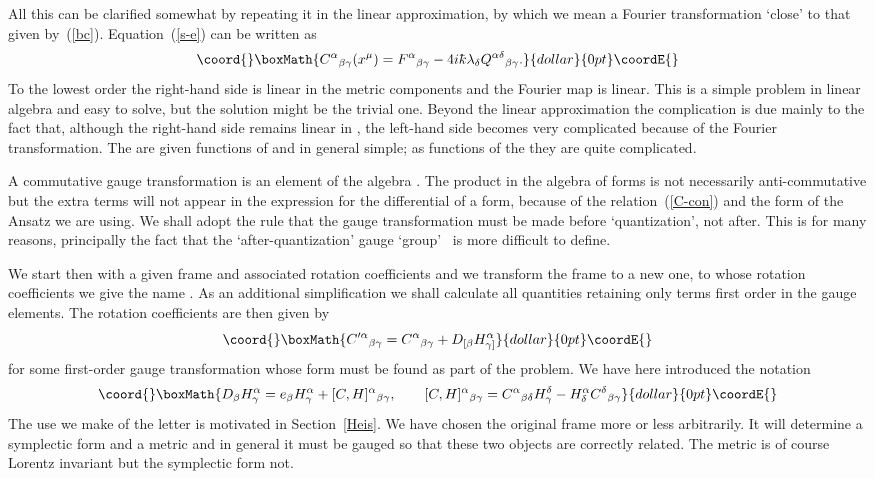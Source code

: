 \documentclass[12pt,a4paper]{article}
\def\b#1{{\mathbb #1}}
\def\c#1{{\cal #1}}
\def\kbar{{\mathchar'26\mkern-9muk}}
\begin{document}
All this can be clarified somewhat by repeating it in the linear
approximation, by which we mean a Fourier transformation `close' to
that given by~(\ref{bc}). Equation~(\ref{s-e}) can be written as
$$\coord{}\boxMath{
C^\alpha{}_{\beta\gamma}(x^\mu) = F^\alpha{}_{\beta\gamma} -
4i\kbar\lambda_\delta Q^{\alpha\delta}{}_{\beta\gamma}.
}{dollar}{0pt}\coordE{}$$
To the lowest order the right-hand side is linear in the metric
components and the Fourier map is linear. This is a simple problem in
linear algebra and easy to solve, but the solution might be the
trivial one. Beyond the linear approximation the complication is due
mainly to the fact that, although the right-hand side remains linear
in \myHighlight{$\lambda_\alpha$}\coordHE{}, the left-hand side becomes very complicated
because of the Fourier transformation. The \coordHE{}
are given functions of \coordHE{} and in general simple; as functions of
the \myHighlight{$\lambda_\alpha$}\coordHE{} they are quite complicated.

A commutative gauge transformation is an element of the algebra
\myHighlight{$M_4(\c{C}(\b{R}^4))$}\coordHE{}.  The product in the algebra of forms is not
necessarily anti-commutative but the extra terms will not appear in
the expression for the differential of a form, because of the
relation~(\ref{C-con}) and the form of the Ansatz we are using. We
shall adopt the rule that the gauge transformation must be made before
`quantization', not after. This is for many reasons, principally the
fact that the `after-quantization' gauge
`group'~\cite{JurMolSchSchWes01} is more difficult to define.

We start then with a given frame and associated rotation coefficients
and we transform the frame to a new one, to whose rotation
coefficients we give the name \coordHE{}.  As an
additional simplification we shall calculate all quantities retaining
only terms first order in the gauge elements.  The rotation
coefficients are then given by
$$\coord{}\boxMath{
C^{\prime\alpha}{}_{\beta\gamma} = C^\alpha{}_{\beta\gamma} + 
D_{[\beta} H^\alpha_{\gamma]}
}{dollar}{0pt}\coordE{}$$
for some first-order gauge transformation whose form must be found
as part of the problem. We have here introduced the notation
$$\coord{}\boxMath{
D_{\beta} H^\alpha_{\gamma} =
e_{\beta} H^\alpha_{\gamma} + [C,H]^\alpha{}_{\beta\gamma}, \qquad
[C,H]^\alpha{}_{\beta\gamma} = 
C^\alpha{}_{\beta\delta} H^\delta_{\gamma} -
H^\alpha_{\delta} C^\delta{}_{\beta\gamma} 
}{dollar}{0pt}\coordE{}$$
The use we make of the letter \coordHE{} is motivated in
Section~\ref{Heis}. We have chosen the original frame more or less
arbitrarily. It will determine a symplectic form and a metric and in
general it must be gauged so that these two objects are correctly
related. The metric is of course Lorentz invariant but the symplectic
form not.
\end{document}
